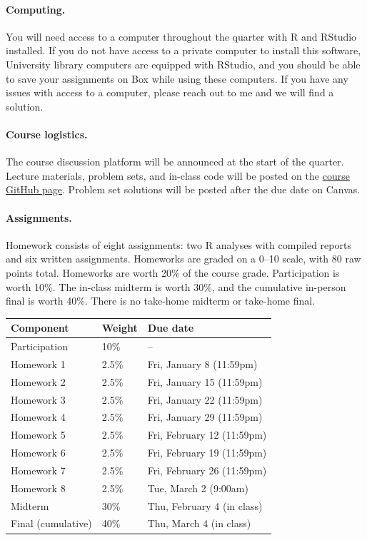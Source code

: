 \documentclass[letterpaper, 12pt, parskip=full,DIV=10]{scrartcl}
\begin{document}
\paragraph{Computing.}
You will need access to a computer throughout the quarter with R and RStudio installed.
If you do not have access to a private computer to install this software, University library computers are equipped with RStudio, and you should be able to save your assignments on Box while using these computers.
If you have any issues with access to a computer, please reach out to me and we will find a solution.

\paragraph{Course logistics.}
The course discussion platform will be announced at the start of the quarter.
Lecture materials, problem sets, and in-class code will be posted on the \href{https://github.com/UChicago-pol-methods/SOSC-13200-W27-7-9}{course GitHub page}.
Problem set solutions will be posted after the due date on Canvas.

\paragraph{Assignments.}
Homework consists of eight assignments: two R analyses with compiled reports and six written assignments.
Homeworks are graded on a 0--10 scale, with 80 raw points total.
Homeworks are worth 20\% of the course grade. Participation is worth 10\%. The in-class midterm is worth 30\%, and the cumulative in-person final is worth 40\%.
There is no take-home midterm or take-home final.

\begin{center}
\begin{tabular}{l l l}
\textbf{Component} & \textbf{Weight} & \textbf{Due date} \\
\hline
Participation & 10\% & -- \\
Homework 1 & 2.5\% & Fri, January 8 (11:59pm) \\
Homework 2 & 2.5\% & Fri, January 15 (11:59pm) \\
Homework 3 & 2.5\% & Fri, January 22 (11:59pm) \\
Homework 4 & 2.5\% & Fri, January 29 (11:59pm) \\
Homework 5 & 2.5\% & Fri, February 12 (11:59pm) \\
Homework 6 & 2.5\% & Fri, February 19 (11:59pm) \\
Homework 7 & 2.5\% & Fri, February 26 (11:59pm) \\
Homework 8 & 2.5\% & Tue, March 2 (9:00am) \\
Midterm & 30\% & Thu, February 4 (in class)\\
Final (cumulative) & 40\% & Thu, March 4 (in class)\\
\end{tabular}
\end{center}
\end{document}
